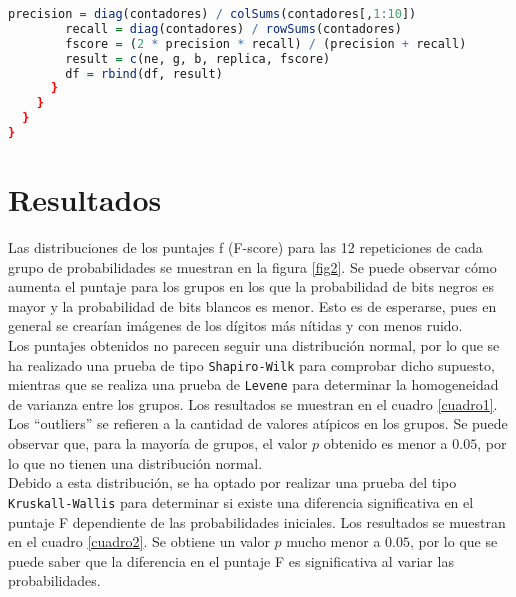 \documentclass{report}
\begin{document}
\begin{lstlisting}[caption=Obtenci\'on del Puntaje F, label=codigo6, language=R]
        precision = diag(contadores) / colSums(contadores[,1:10])
        recall = diag(contadores) / rowSums(contadores)
        fscore = (2 * precision * recall) / (precision + recall)
        result = c(ne, g, b, replica, fscore)
        df = rbind(df, result)
      }
    }
  }
}
\end{lstlisting}

\section{Resultados}

Las distribuciones de los puntajes f (F-score) para las 12 repeticiones de cada grupo de probabilidades se muestran en la figura \ref{fig2}. Se puede observar c\'omo aumenta el puntaje para los grupos en los que la probabilidad de bits negros es mayor y la probabilidad de bits blancos es menor. Esto es de esperarse, pues en general se crear\'ian im\'agenes de los d\'igitos m\'as n\'itidas y con menos ruido.\\

Los puntajes obtenidos no parecen seguir una distribuci\'on normal, por lo que se ha realizado una prueba de tipo \texttt{Shapiro-Wilk} para comprobar dicho supuesto, mientras que se realiza una prueba de \texttt{Levene} para determinar la homogeneidad de varianza entre los grupos. Los resultados se muestran en el cuadro \ref{cuadro1}. Los ``outliers'' se refieren a la cantidad de valores at\'ipicos en los grupos. Se puede observar que, para la mayor\'ia de grupos, el valor $p$ obtenido es menor a $0.05$, por lo que no tienen una distribuci\'on normal.\\

Debido a esta distribuci\'on, se ha optado por realizar una prueba del tipo \texttt{Kruskall-Wallis} para determinar si existe una diferencia significativa en el puntaje F dependiente de las probabilidades iniciales. Los resultados se muestran en el cuadro \ref{cuadro2}. Se obtiene un valor $p$ mucho menor a $0.05$, por lo que se puede saber que la diferencia en el puntaje F es significativa al variar las probabilidades.
\end{document}

